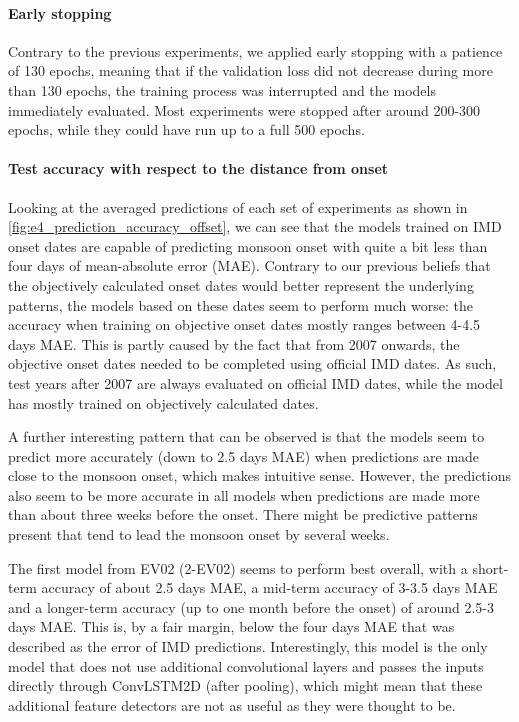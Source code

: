 \paragraph{Early stopping}
Contrary to the previous experiments, we applied early stopping with a patience of 130 epochs, meaning that if the validation loss did not decrease during more than 130 epochs, the training process was interrupted and the models immediately evaluated. Most experiments were stopped after around 200-300 epochs, while they could have run up to a full 500 epochs.

\paragraph{Test accuracy with respect to the distance from onset}
Looking at the averaged predictions of each set of experiments as shown in \cref{fig:e4_prediction_accuracy_offset}, we can see that the models trained on IMD onset dates are capable of predicting monsoon onset with quite a bit less than four days of mean-absolute error (MAE). Contrary to our previous beliefs that the objectively calculated onset dates would better represent the underlying patterns, the models based on these dates seem to perform much worse: the accuracy when training on objective onset dates mostly ranges between 4-4.5 days MAE. This is partly caused by the fact that from 2007 onwards, the objective onset dates needed to be completed using official IMD dates. As such, test years after 2007 are always evaluated on official IMD dates, while the model has mostly trained on objectively calculated dates.

A further interesting pattern that can be observed is that the models seem to predict more accurately (down to 2.5 days MAE) when predictions are made close to the monsoon onset, which makes intuitive sense. However, the predictions also seem to be more accurate in all models when predictions are made more than about three weeks before the onset. There might be predictive patterns present that tend to lead the monsoon onset by several weeks.

The first model from EV02 (2-EV02) seems to perform best overall, with a short-term accuracy of about 2.5 days MAE, a mid-term accuracy of 3-3.5 days MAE and a longer-term accuracy (up to one month before the onset) of around 2.5-3 days MAE. This is, by a fair margin, below the four days MAE that was described as the error of IMD predictions. Interestingly, this model is the only model that does not use additional convolutional layers and passes the inputs directly through ConvLSTM2D (after pooling), which might mean that these additional feature detectors are not as useful as they were thought to be.

